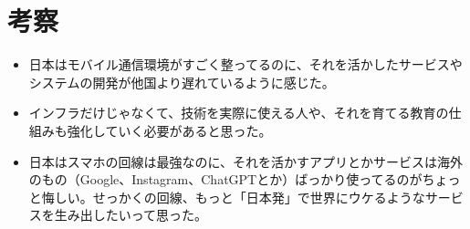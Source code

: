 \documentclass[a4paper,11pt,dvipdfmx]{ujarticle}
\begin{document}
\section{考察}
\begin{itemize}
  \item 日本はモバイル通信環境がすごく整ってるのに、それを活かしたサービスやシステムの開発が他国より遅れているように感じた。
  \item インフラだけじゃなくて、技術を実際に使える人や、それを育てる教育の仕組みも強化していく必要があると思った。
  \item 日本はスマホの回線は最強なのに、それを活かすアプリとかサービスは海外のもの（Google、Instagram、ChatGPTとか）ばっかり使ってるのがちょっと悔しい。せっかくの回線、もっと「日本発」で世界にウケるようなサービスを生み出したいって思った。
\end{itemize}

  





%

%


\end{document}
